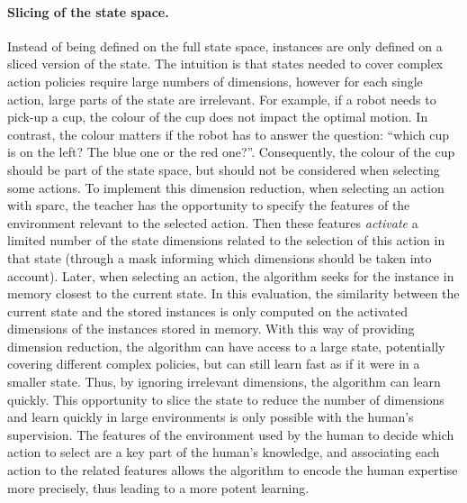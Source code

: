 \paragraph{Slicing of the state space.} Instead of being defined on the full state space, instances are only defined on a sliced version of the state. The intuition is that states needed to cover complex action policies require large numbers of dimensions, however for each single action, large parts of the state are irrelevant. For example, if a robot needs to pick-up a cup, the colour of the cup does not impact the optimal motion. In contrast, the colour matters if the robot has to answer the question: ``which cup is on the left? The blue one or the red one?''. Consequently, the colour of the cup should be part of the state space, but should not be considered when selecting some actions. To implement this dimension reduction, when selecting an action with \gls{sparc}, the teacher has the opportunity to specify the features of the environment relevant to the selected action. Then these features \textit{activate} a limited number of the state dimensions related to the selection of this action in that state (through a mask informing which dimensions should be taken into account). Later, when selecting an action, the algorithm seeks for the instance in memory closest to the current state. In this evaluation, the similarity between the current state and the stored instances is only computed on the activated dimensions of the instances stored in memory. With this way of providing dimension reduction, the algorithm can have access to a large state, potentially covering different complex policies, but can still learn fast as if it were in a smaller state. Thus, by ignoring irrelevant dimensions, the algorithm can learn quickly. This opportunity to slice the state to reduce the number of dimensions and learn quickly in large environments is only possible with the human's supervision. The features of the environment used by the human to decide which action to select are a key part of the human's knowledge, and associating each action to the related features allows the algorithm to encode the human expertise more precisely, thus leading to a more potent learning.

